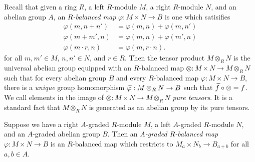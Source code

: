 \documentclass[../main.tex]{subfiles}
\begin{document}
Recall that given a ring $R$, a left $R$-module $M$, a right $R$-module $N$, and an abelian group $A$, an \emph{$R$-balanced map} $\varphi:M\times N\to B$ is one which satisifies
\begin{align*}
	\varphi(m,n+n')&=\varphi(m,n)+\varphi(m,n') \\
	\varphi(m+m',n)&=\varphi(m,n)+\varphi(m',n) \\
	\varphi(m\cdot r,n)&=\varphi(m,r\cdot n).
\end{align*}
for all $m,m'\in M$, $n,n'\in N$, and $r\in R$. Then the tensor product $M\otimes_RN$ is the universal abelian group equipped with an $R$-balanced map $\otimes:M\times N\to M\otimes_RN$ such that for every abelian group $B$ and every $R$-balanced map $\varphi:M\times N\to B$, there is a \emph{unique} group homomorphism $\widetilde\varphi:M\otimes_RN\to B$ such that $\widetilde f\circ\otimes=f$. We call elements in the image of $\otimes:M\times N\to M\otimes_RN$ \emph{pure tensors}. It is a standard fact that $M\otimes_RN$ is generated as an abelian group by its pure tensors.

\begin{definition}\label{A-graded_R-balanced_map_defn}
	Suppose we have a right $A$-graded $R$-module $M$, a left $A$-graded $R$-module $N$, and an $A$-graded abelian group $B$. Then an \emph{$A$-graded $R$-balanced map} $\varphi:M\times N\to B$ is an $R$-balanced map which restricts to $M_a\times N_b\to B_{a+b}$ for all $a,b\in A$.
\end{definition}
\end{document}
